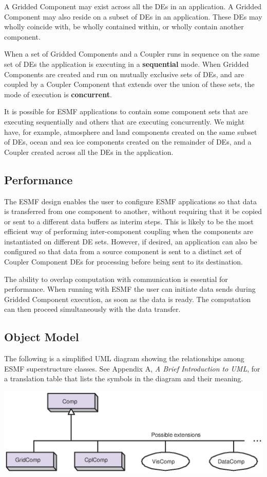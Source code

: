 A Gridded Component may exist across all the DEs in an application.  
A Gridded Component may also reside on a subset of DEs in an 
application.  These DEs may wholly coincide with, be wholly contained 
within, or wholly contain another component.  

When a set of Gridded  Components and a Coupler runs in sequence 
on the same set of DEs the application is executing in a {\bf sequential} 
mode. When Gridded Components are created and run on mutually exclusive
sets of DEs, and are coupled by a Coupler Component that extends over
the union of these sets, the mode of execution is {\bf concurrent}.

It is possible for ESMF applications to contain some component sets
that are executing sequentially and others that are executing concurrently.
We might have, for example, atmosphere and land components created 
on the same subset of DEs, ocean and sea ice components created on 
the remainder of DEs, and a Coupler created across all the DEs in
the application.

\subsection{Performance}
\label{sec:performance}

The ESMF design enables the user to configure ESMF
applications so that data is transferred from one component to another, 
without requiring that it be copied or sent to a different data
buffers as interim steps.  This is likely to be the most efficient way 
of performing inter-component coupling when the components are instantiated 
on different DE sets.  However, if desired, an application can also be 
configured so that data from a source component is sent to a distinct set of 
Coupler Component DEs for processing before being sent to its 
destination.

The ability to overlap computation with communication is essential for
performance.  When running with ESMF the user can initiate data 
sends during Gridded Component execution, as soon as the data is ready.
The computation can then proceed simultaneously with the data transfer.

\newpage
\subsection{Object Model}

The following is a simplified UML diagram showing the relationships among
ESMF superstructure classes.  See Appendix A, {\it A Brief 
Introduction to UML},
for a translation table that lists the symbols in the diagram and their 
meaning.

\begin{center}
\includegraphics{Comp_obj.eps}   
\end{center}



